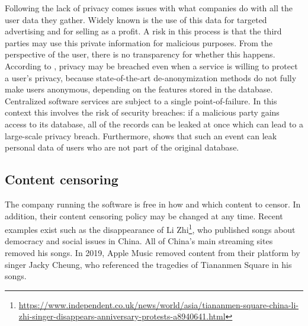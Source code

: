 Following the lack of privacy comes issues with what companies do with all the user data they gather. Widely known is the use of this data for targeted advertising\cite{jessup2012big} and for selling as a profit\cite{yap2011user}. A risk in this process is that the third parties may use this private information for malicious purposes\cite{yap2011user}. From the perspective of the user, there is no transparency for whether this happens. According to \cite{narayanan2008robust}, privacy may be breached even when a service is willing to protect a user's privacy, because state-of-the-art de-anonymization methods do not fully make users anonymous, depending on the features stored in the database. Centralized software services are subject to a single point-of-failure. In this context this involves the risk of security breaches: if a malicious party gains access to its database, all of the records can be leaked at once which can lead to a large-scale privacy breach. Furthermore, \cite{dworkdifferential} shows that such an event can leak personal data of users who are not part of the original database.
\subsection{Content censoring}
The company running the software is free in how and which content to censor. In addition, their content censoring policy may be changed at any time. Recent examples exist such as the disappearance of Li Zhi\footnote{\url{https://www.independent.co.uk/news/world/asia/tiananmen-square-china-li-zhi-singer-disappears-anniversary-protests-a8940641.html}}, who published songs about democracy and social issues in China. All of China's main streaming sites removed his songs. In 2019, Apple Music removed content from their platform by singer Jacky Cheung, who referenced the tragedies of Tiananmen Square in his songs.

